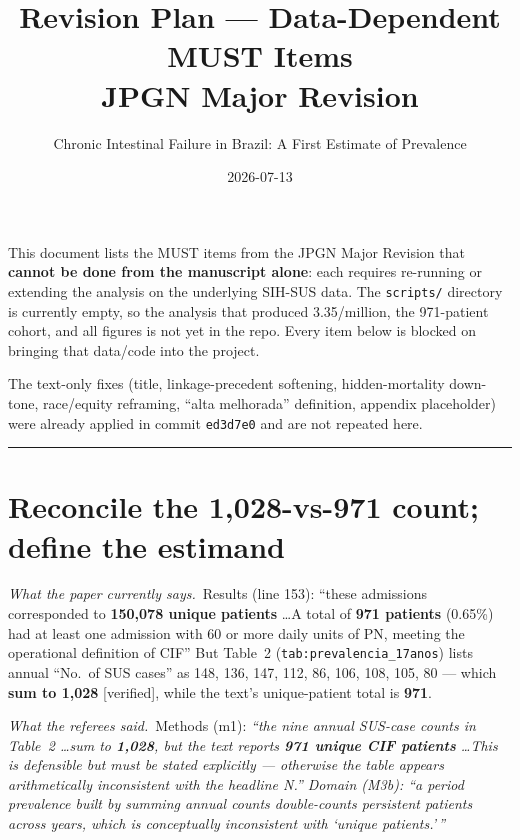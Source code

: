 \documentclass[11pt,a4paper]{article}
\title{\textbf{Revision Plan --- Data-Dependent MUST Items}\\[2pt]
\large JPGN Major Revision}
\author{Chronic Intestinal Failure in Brazil: A First Estimate of Prevalence}
\date{2026-07-13}
\newenvironment{papersays}%
  {\def\FrameCommand{{\color{rulegray}\vrule width 1.5pt}\hspace{6pt}%
     \colorbox{paperbg}}%
   \MakeFramed{\advance\hsize-\width \FrameRestore}\small}%
  {\endMakeFramed}
\newenvironment{refereesays}%
  {\def\FrameCommand{{\color{rulegray}\vrule width 1.5pt}\hspace{6pt}%
     \colorbox{refbg}}%
   \MakeFramed{\advance\hsize-\width \FrameRestore}\small\itshape}%
  {\endMakeFramed}
\begin{document}
\maketitle

\noindent
This document lists the MUST items from the JPGN Major Revision that \textbf{cannot be
done from the manuscript alone}: each requires re-running or extending the analysis on the
underlying SIH-SUS data. The \texttt{scripts/} directory is currently empty, so the analysis
that produced 3.35/million, the 971-patient cohort, and all figures is not yet in the repo.
Every item below is blocked on bringing that data/code into the project.

The text-only fixes (title, linkage-precedent softening, hidden-mortality down-tone,
race/equity reframing, ``alta melhorada'' definition, appendix placeholder) were already
applied in commit \texttt{ed3d7e0} and are not repeated here.

\medskip
\hrule
\medskip

\newcommand{\papersaysHead}{\textit{What the paper currently says.}}
\newcommand{\refereeHead}{\textit{What the referees said.}}
\newcommand{\whyHead}{\textbf{Why data is required.}}
\newcommand{\opHead}{\textbf{Data operation.}}

\section{Reconcile the 1,028-vs-971 count; define the estimand}

\papersaysHead\ Results (line 153):
\begin{papersays}
``these admissions corresponded to \textbf{150,078 unique patients} \ldots A total of
\textbf{971 patients} (0.65\%) had at least one admission with 60 or more daily units of PN,
meeting the operational definition of CIF''
\end{papersays}
But Table~2 (\texttt{tab:prevalencia\_17anos}) lists annual ``No.\ of SUS cases'' as
148, 136, 147, 112, 86, 106, 108, 105, 80 --- which \textbf{sum to 1,028} [verified], while the
text's unique-patient total is \textbf{971}.

\refereeHead\ Methods (m1):
\begin{refereesays}
``the nine annual SUS-case counts in Table~2 \ldots sum to \textbf{1,028}, but the text
reports \textbf{971 unique CIF patients} \ldots This is defensible but must be stated
explicitly --- otherwise the table appears arithmetically inconsistent with the headline N.''
\end{refereesays}
Domain (M3b):
\begin{refereesays}
``a \textit{period prevalence} built by summing annual counts double-counts persistent
patients across years, which is conceptually inconsistent with `unique patients.'\,''
\end{refereesays}
\end{document}
